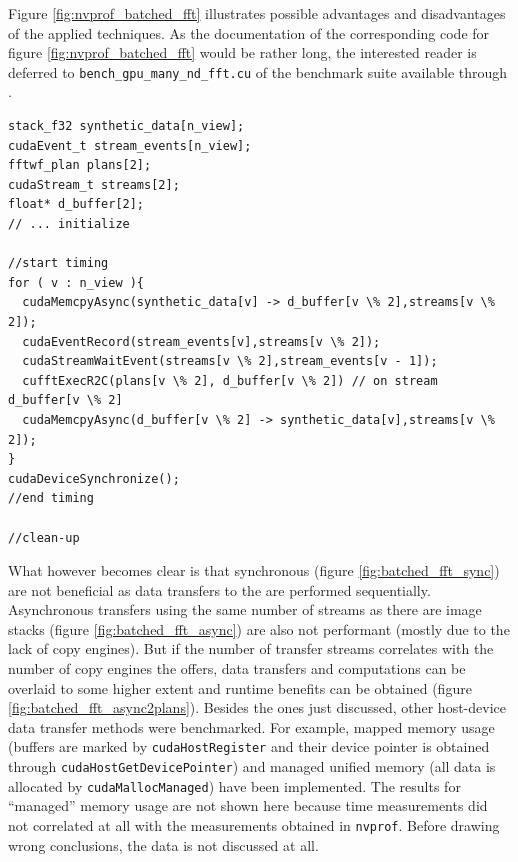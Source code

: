 Figure \ref{fig:nvprof_batched_fft} illustrates possible advantages and disadvantages of the applied techniques. As the documentation of the corresponding code for figure \ref{fig:nvprof_batched_fft} would be rather long, the interested reader is deferred to \texttt{bench\_gpu\_many\_nd\_fft.cu} of the \lmvn{} benchmark suite available through \cite{lmvn_repo}. 

\begin{lstlisting}[caption={Asynchronous Batched FFT on synthetic data performed on GPU in pseudo-code based on the \cufft{} syntax.},label={lst:batched_fft_gpu_async2plans}]
stack_f32 synthetic_data[n_view];
cudaEvent_t stream_events[n_view];
fftwf_plan plans[2];
cudaStream_t streams[2];
float* d_buffer[2];
// ... initialize 

//start timing
for ( v : n_view ){
  cudaMemcpyAsync(synthetic_data[v] -> d_buffer[v \% 2],streams[v \% 2]);
  cudaEventRecord(stream_events[v],streams[v \% 2]);
  cudaStreamWaitEvent(streams[v \% 2],stream_events[v - 1]);
  cufftExecR2C(plans[v \% 2], d_buffer[v \% 2]) // on stream d_buffer[v \% 2]
  cudaMemcpyAsync(d_buffer[v \% 2] -> synthetic_data[v],streams[v \% 2]);
}
cudaDeviceSynchronize();
//end timing

//clean-up
\end{lstlisting}


What however becomes clear is that synchronous (figure \ref{fig:batched_fft_sync}) are not beneficial as data transfers to the \gpu{} are performed sequentially. Asynchronous transfers using the same number of streams as there are image stacks (figure \ref{fig:batched_fft_async}) are also not performant (mostly due to the lack of copy engines). But if the number of transfer streams correlates with the number of copy engines the \gpu{} offers, data transfers and computations can be overlaid to some higher extent and runtime benefits can be obtained (figure \ref{fig:batched_fft_async2plans}). Besides the ones just discussed, other host-device data transfer methods were benchmarked. 
For example, mapped memory usage (buffers are marked by \texttt{cudaHostRegister} and their device pointer is obtained through \texttt{cudaHostGetDevicePointer}) and managed unified memory (all data is allocated by \texttt{cudaMallocManaged}) have been implemented. The results for ``managed'' memory usage are not shown here because time measurements did not correlated at all with the measurements obtained in \texttt{nvprof}. Before drawing wrong conclusions, the data is not discussed at all. 

